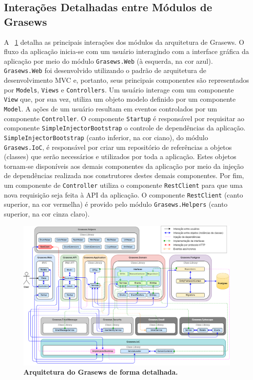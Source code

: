 \subsection{Interações Detalhadas entre Módulos de Grasews}\label{4-grasews-interacoes-detalhadas-modulos}

A \figurename~\ref{fig:grasews-architecture-detailed} detalha as principais interações dos módulos da arquitetura de Grasews. O fluxo da aplicação inicia-se com um usuário interagindo com a interface gráfica da aplicação por meio do módulo  \texttt{Grasews.Web} (à esquerda, na cor azul). \texttt{Grasews.Web} foi desenvolvido utilizando o padrão de arquitetura de desenvolvimento MVC e, portanto, seus principais componentes são representados por \texttt{Models}, \texttt{Views} e \texttt{Controllers}. Um usuário interage com um componente \texttt{View} que, por sua vez, utiliza um objeto modelo definido por um componente \texttt{Model}. A ações de um usuário resultam em eventos controlados por um componente \texttt{Controller}. O componente \texttt{Startup} é responsável por requisitar ao componente \texttt{SimpleInjectorBootstrap} o controle de dependências da aplicação. \texttt{SimpleInjectorBootstrap} (canto inferior, na cor ciano), do módulo \texttt{Grasews.IoC}, é responsável por criar um repositório de referências a objetos (classes) que serão necessários e utilizados por toda a aplicação. Estes objetos tornam-se disponíveis aos demais componentes da aplicação por meio da injeção de dependências realizada nos construtores destes demais componentes. Por fim, um componente de \texttt{Controller} utiliza o componente \texttt{RestClient} para que uma nova requisição seja feita à API da aplicação. O componente \texttt{RestClient} (canto superior, na cor vermelha) é provido pelo módulo \texttt{Grasews.Helpers} (canto superior, na cor cinza claro).

\begin{landscape}
    \begin{figure}[h]
        \includegraphics[scale=0.6]{4-grasews/imagens/grasews-architecture-detailed.png}
        \centering
        \caption[Arquitetura do Grasews de forma detalhada]{\textbf{Arquitetura do Grasews de forma detalhada.}}
        \label{fig:grasews-architecture-detailed}
    \end{figure}
\end{landscape}

